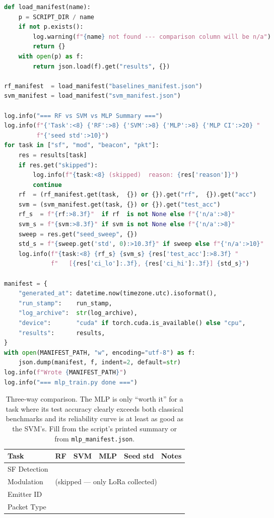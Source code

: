 \documentclass[11pt,letterpaper]{article}
\begin{document}
\begin{lstlisting}[language=Python]
def load_manifest(name):
    p = SCRIPT_DIR / name
    if not p.exists():
        log.warning(f"{name} not found --- comparison column will be n/a")
        return {}
    with open(p) as f:
        return json.load(f).get("results", {})

rf_manifest  = load_manifest("baselines_manifest.json")
svm_manifest = load_manifest("svm_manifest.json")

log.info("=== RF vs SVM vs MLP Summary ===")
log.info(f"{'Task':<8} {'RF':>8} {'SVM':>8} {'MLP':>8} {'MLP CI':>20} "
         f"{'seed std':>10}")
for task in ["sf", "mod", "beacon", "pkt"]:
    res = results[task]
    if res.get("skipped"):
        log.info(f"{task:<8} (skipped)  reason: {res['reason']}")
        continue
    rf  = (rf_manifest.get(task,  {}) or {}).get("rf",  {}).get("acc")
    svm = (svm_manifest.get(task, {}) or {}).get("test_acc")
    rf_s  = f"{rf:>8.3f}"  if rf  is not None else f"{'n/a':>8}"
    svm_s = f"{svm:>8.3f}" if svm is not None else f"{'n/a':>8}"
    sweep = res.get("seed_sweep", {})
    std_s = f"{sweep.get('std', 0):>10.3f}" if sweep else f"{'n/a':>10}"
    log.info(f"{task:<8} {rf_s} {svm_s} {res['test_acc']:>8.3f} "
             f"   [{res['ci_lo']:.3f}, {res['ci_hi']:.3f}] {std_s}")

manifest = {
    "generated_at": datetime.now(timezone.utc).isoformat(),
    "run_stamp":    run_stamp,
    "log_archive":  str(log_archive),
    "device":       "cuda" if torch.cuda.is_available() else "cpu",
    "results":      results,
}
with open(MANIFEST_PATH, "w", encoding="utf-8") as f:
    json.dump(manifest, f, indent=2, default=str)
log.info(f"Wrote {MANIFEST_PATH}")
log.info("=== mlp_train.py done ===")
\end{lstlisting}

\begin{table}[h!]
	\centering
	\renewcommand{\arraystretch}{1.4}
	\begin{tabularx}{\textwidth}{l c c c c X}
		\toprule
		\textbf{Task} & \textbf{RF} & \textbf{SVM} & \textbf{MLP} & \textbf{Seed std} & \textbf{Notes} \\
		\midrule
		SF Detection     & & & & & \\
		Modulation       & \multicolumn{5}{l}{(skipped --- only LoRa collected)} \\
		Emitter ID       & & & & & \\
		Packet Type      & & & & & \\
		\bottomrule
	\end{tabularx}
	\caption{Three-way comparison. The \mbox{MLP} is only ``worth it'' for a task where its test accuracy clearly exceeds both classical benchmarks and its reliability curve is at least as good as the \mbox{SVM}'s. Fill from the script's printed summary or from \texttt{mlp\_manifest.json}.}
\end{table}
\end{document}
